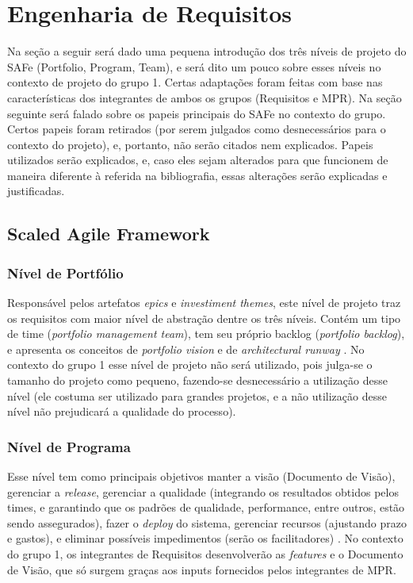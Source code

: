 \chapter[Engenharia de Requisitos]{Engenharia de Requisitos}
Na seção a seguir será dado uma pequena introdução dos três níveis de projeto do SAFe (Portfolio, Program, Team), e será dito um pouco sobre esses níveis no contexto de projeto do grupo 1. Certas adaptações foram feitas com base nas características dos integrantes de ambos os grupos (Requisitos e MPR). Na seção seguinte será falado sobre os papeis principais do SAFe no contexto do grupo. Certos papeis foram retirados (por serem julgados como desnecessários para o contexto do projeto), e, portanto, não serão citados nem explicados. Papeis utilizados serão explicados, e, caso eles sejam alterados para que funcionem de maneira diferente à referida na bibliografia, essas alterações serão explicadas e justificadas.

\section{Scaled Agile Framework}
\subsection{Nível de Portfólio}
Responsável pelos artefatos \emph{epics} e \emph{investiment themes}, este nível de projeto traz os requisitos com maior nível de abstração dentre os três níveis. Contém um tipo de time (\emph{portfolio management team}), tem seu próprio backlog (\emph{portfolio backlog}), e apresenta os conceitos de \emph{portfolio vision} e de \emph{architectural runway} \cite[p. 227-228]{safe001}. No contexto do grupo 1 esse nível de projeto não será utilizado, pois julga-se o tamanho do projeto como pequeno, fazendo-se desnecessário a utilização desse nível (ele costuma ser utilizado para grandes projetos, e a não utilização desse nível não prejudicará a qualidade do processo).

\subsection{Nível de Programa}
Esse nível tem como principais objetivos manter a visão (Documento de Visão), gerenciar a \emph{release}, gerenciar a qualidade (integrando os resultados obtidos pelos times, e garantindo que os padrões de qualidade, performance, entre outros, estão sendo assegurados), fazer o \emph{deploy} do sistema, gerenciar recursos (ajustando prazo e gastos), e eliminar possíveis impedimentos (serão os facilitadores) \cite[p. 63-64]{safe001}. No contexto do grupo 1, os integrantes de Requisitos desenvolverão as \emph{features} e o Documento de Visão, que só surgem graças aos inputs fornecidos pelos integrantes de MPR.

